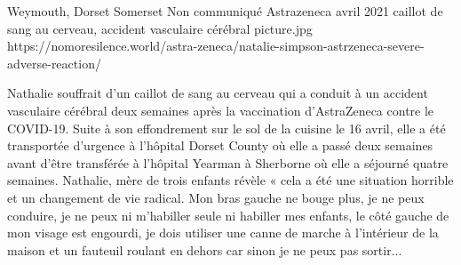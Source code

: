 {Weymouth, Dorset Somerset}
{Non communiqué}
{Astrazeneca}
{avril 2021}
{caillot de sang au cerveau, accident vasculaire cérébral}
{picture.jpg}
{https://nomoresilence.world/astra-zeneca/natalie-simpson-astrzeneca-severe-adverse-reaction/}
{

Nathalie souffrait d’un caillot de sang au cerveau qui a conduit à un accident
vasculaire cérébral deux semaines après la vaccination d’AstraZeneca contre le
COVID-19. Suite à son effondrement sur le sol de la cuisine le 16 avril, elle a
été transportée d’urgence à l’hôpital Dorset County où elle a passé deux
semaines avant d’être transférée à l’hôpital Yearman à Sherborne où elle a
séjourné quatre semaines. Nathalie, mère de trois enfants révèle « cela a été
une situation horrible et un changement de vie radical. Mon bras gauche ne bouge
plus, je ne peux conduire, je ne peux ni m’habiller seule ni habiller mes
enfants, le côté gauche de mon visage est engourdi, je dois utiliser une canne
de marche à l’intérieur de la maison et un fauteuil roulant en dehors car sinon
je ne peux pas sortir...

}

